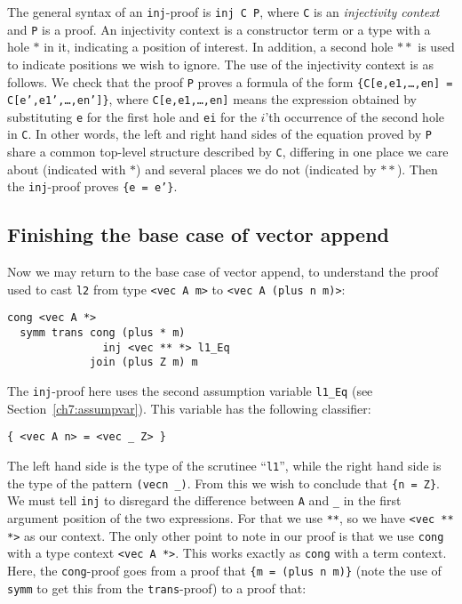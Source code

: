 \documentclass{book}[12pt]
\begin{document}
The general syntax of an \texttt{inj}-proof is \texttt{inj C P}, where
\texttt{C} is an \emph{injectivity context} and \texttt{P} is a proof.
An injectivity context is a constructor term or a type with a hole $*$
in it, indicating a position of interest.  In addition, a second hole
$**$ is used to indicate positions we wish to ignore.  The use of the
injectivity context is as follows.  We check that the proof \texttt{P}
proves a formula of the form \texttt{\{C[e,e1,\ldots,en] =
C[e',e1',\ldots,en']\}}, where \texttt{C[e,e1,\ldots,en]} means the
expression obtained by substituting \texttt{e} for the first hole and
\texttt{ei} for the $i$'th occurrence of the second hole in
\texttt{C}.  In other words, the left and right hand sides of the
equation proved by \texttt{P} share a common top-level structure
described by \texttt{C}, differing in one place we care about
(indicated with $*$) and several places we do not (indicated by $**$).
Then the \texttt{inj}-proof proves \texttt{\{e = e'\}}.

\subsection{Finishing the base case of vector append}

Now we may return to the base case of vector append, to understand the
proof used to cast \texttt{l2} from type \texttt{<vec A m>} to
\texttt{<vec A (plus n m)>}:

\begin{verbatim}
cong <vec A *>
  symm trans cong (plus * m)
               inj <vec ** *> l1_Eq
             join (plus Z m) m
\end{verbatim}

\noindent The \texttt{inj}-proof here uses the second assumption
variable \texttt{l1\_Eq} (see Section~\ref{ch7:assumpvar}).  This
variable has the following classifier:

\begin{verbatim}
{ <vec A n> = <vec _ Z> }
\end{verbatim}

\noindent The left hand side is the type of the scrutinee
``\texttt{l1}'', while the right hand side is the type of the pattern
\texttt{(vecn \_)}.  From this we wish to conclude that \texttt{\{n =
Z\}}.  We must tell \texttt{inj} to disregard the difference between
\texttt{A} and \texttt{\_} in the first argument position of the two
expressions.  For that we use \texttt{**}, so we have \texttt{<vec **
*>} as our context.  The only other point to note in our proof is that
we use \texttt{cong} with a type context \texttt{<vec A *>}.  This
works exactly as \texttt{cong} with a term context.  Here, the
\texttt{cong}-proof goes from a proof that \texttt{\{m = (plus n m)\}}
(note the use of \texttt{symm} to get this from the
\texttt{trans}-proof) to a proof that:
\end{document}
